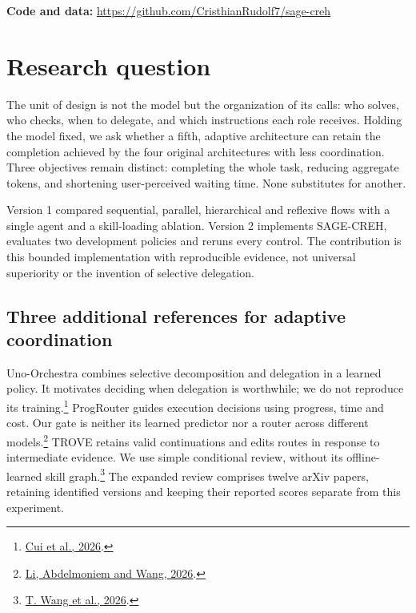 \documentclass[11pt,a4paper]{article}
\newcommand{\source}[2]{\footnote{\href{#1}{#2}.}}
\begin{document}


{\small\textbf{Code and data:} \url{https://github.com/CristhianRudolf7/sage-creh}\par}

\section{Research question}
The unit of design is not the model but the organization of its calls: who solves,
who checks, when to delegate, and which instructions each role receives. Holding
the model fixed, we ask whether a fifth, adaptive architecture can retain the
completion achieved by the four original architectures with less coordination.
Three objectives remain distinct: completing the whole task, reducing aggregate
tokens, and shortening user-perceived waiting time. None substitutes for another.

Version 1 compared sequential, parallel, hierarchical and reflexive flows with a
single agent and a skill-loading ablation. Version 2 implements SAGE-CREH, evaluates
two development policies and reruns every control. The contribution is this
bounded implementation with reproducible evidence, not universal superiority or
the invention of selective delegation.


\subsection{Three additional references for adaptive coordination}
Uno-Orchestra combines selective decomposition and delegation in a learned policy.
It motivates deciding when delegation is worthwhile; we do not reproduce its
training.\source{https://arxiv.org/html/2605.05007v1}{Cui et al., 2026}
ProgRouter guides execution decisions using progress, time and cost. Our gate is
neither its learned predictor nor a router across different models.\source{https://arxiv.org/html/2608.25992v1}{Li, Abdelmoniem and Wang, 2026}
TROVE retains valid continuations and edits routes in response to intermediate
evidence. We use simple conditional review, without its offline-learned skill
graph.\source{https://arxiv.org/html/2609.05019v1}{T. Wang et al., 2026}
The expanded review comprises twelve arXiv papers, retaining identified versions
and keeping their reported scores separate from this experiment.
\end{document}

